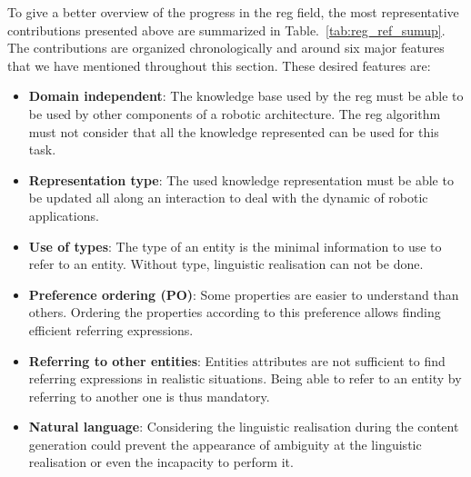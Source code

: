 To give a better overview of the progress in the \acrshort{reg} field, the most representative contributions presented above are summarized in Table.~\ref{tab:reg_ref_sumup}. The contributions are organized chronologically and around six major features that we have mentioned throughout this section. These desired features are:
\begin{itemize}
	\item \textbf{Domain independent}: The knowledge base used by the \acrshort{reg} must be able to be used by other components of a robotic architecture. The \acrshort{reg} algorithm must not consider that all the knowledge represented can be used for this task.
	\item \textbf{Representation type}: The used knowledge representation must be able to be updated all along an interaction to deal with the dynamic of robotic applications.
	\item \textbf{Use of types}: The type of an entity is the minimal information to use to refer to an entity. Without type, linguistic realisation can not be done.
	\item \textbf{Preference ordering (PO)}: Some properties are easier to understand than others. Ordering the properties according to this preference allows finding efficient referring expressions.
	\item \textbf{Referring to other entities}: Entities attributes are not sufficient to find referring expressions in realistic situations. Being able to refer to an entity by referring to another one is thus mandatory.
	\item \textbf{Natural language}: Considering the linguistic realisation during the content generation could prevent the appearance of ambiguity at the linguistic realisation or even the incapacity to perform it.
\end{itemize}

